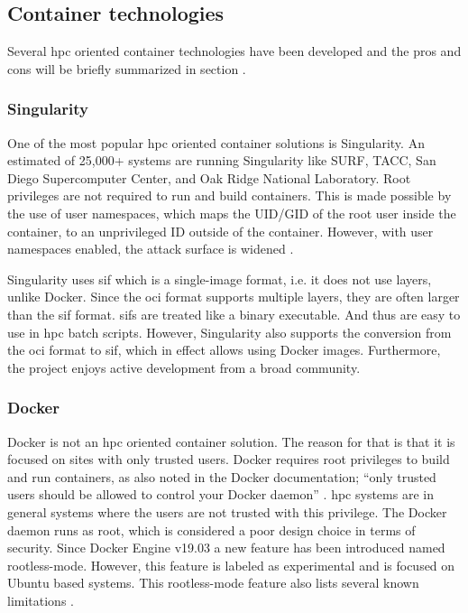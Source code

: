 \documentclass[12pt]{article}
\begin{document}
\subsection{Container technologies}
Several \gls{hpc} oriented container technologies have been developed and the pros and cons will be briefly summarized in section \cite{hpc-workloads-justin, saha2018evaluation, stackhpc-state-of-hpc}.


\subsubsection{Singularity}
One of the most popular \gls{hpc} oriented container solutions is Singularity. An estimated of 25,000+ systems are running Singularity like SURF, TACC, San Diego Supercomputer Center, and Oak Ridge National Laboratory. Root privileges are not required to run and build containers. This is made possible by the use of user namespaces, which maps the UID/GID of the root user inside the container, to an unprivileged ID outside of the container. However, with user namespaces enabled, the attack surface is widened \cite{rhel-cve}.

Singularity uses \gls{sif} which is a single-image format, i.e. it does not use layers, unlike Docker. Since the \gls{oci} format supports multiple layers, they are often larger than the \gls{sif} format. \glspl{sif} are treated like a binary executable. And thus are easy to use in \gls{hpc} batch scripts. However, Singularity also supports the conversion from the \gls{oci} format to \gls{sif}, which in effect allows using Docker images. Furthermore, the project enjoys active development from a broad community.


\subsubsection{Docker}
Docker is not an \gls{hpc} oriented container solution. The reason for that is that it is focused on sites with only trusted users. Docker requires root privileges to build and run containers, as also noted in the Docker documentation; ``only trusted users should be allowed to control your Docker daemon'' \cite{docker-security}. \gls{hpc} systems are in general systems where the users are not trusted with this privilege. The Docker daemon runs as root, which is considered a poor design choice in terms of security. Since Docker Engine v19.03 a new feature has been introduced named rootless-mode. However, this feature is labeled as experimental and is focused on Ubuntu based systems. This rootless-mode feature also lists several known limitations \cite{docker-rootless}.
\end{document}

